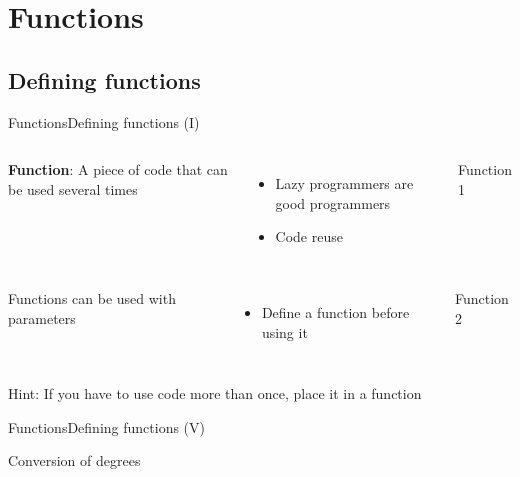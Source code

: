 \documentclass[10pt,compress]{beamer} %
\begin{document}
\section{Functions}
\subsection{Defining functions}
\begin{frame}{Functions}{Defining functions (I)}
    \begin{columns}
	\textbf{Function}: A piece of code that can be used several times
		\begin{itemize}
		\item Lazy programmers are good programmers
		\item Code reuse
		\end{itemize}
		\begin{exampleblock}{Function 1}
		\vspace{-0.2cm}
		
		\vspace{-0.2cm}
		\end{exampleblock}
	\end{columns}

    \begin{columns}
	Functions can be used with parameters
		\begin{itemize}
		\item Define a function before using it
		\end{itemize}

		\begin{exampleblock}{Function 2}
		\vspace{-0.2cm}
		
		\vspace{-0.2cm}
		\end{exampleblock}
	\end{columns}
	\bigskip
	\centering \alert{Hint: If you have to use code more than once, place it in a function}
\end{frame}


\begin{frame}{Functions}{Defining functions (V)}
	\begin{exampleblock}{Conversion of degrees}
	\vspace{-0.2cm}
	
	\vspace{-0.2cm}
	\end{exampleblock}
\end{frame}
\end{document}
